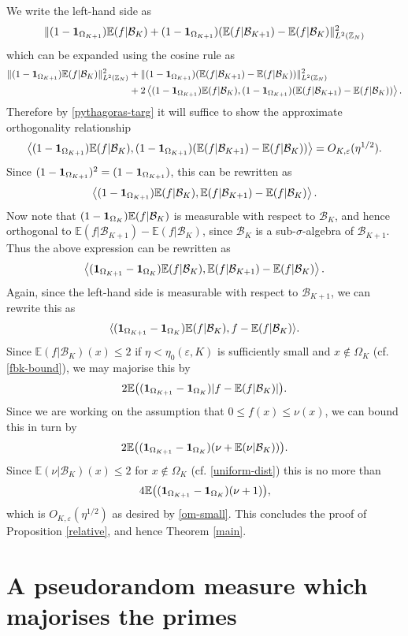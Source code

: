 \documentclass[12pt,a4paper,reqno]{amsart}
\numberwithin{equation}{section}
\theoremstyle{plain}
\theoremstyle{definition}
\renewcommand{\leq}{\leqslant}
\def\B{{\mathcal B}}
\def\Z{{\mathbb Z}}
\def\E{{\mathbb E}}
\def\eps{{\varepsilon}}
\def\ni{\noindent}
\def\endproof{\hfill{\usebox{\proofbox}}}
\begin{document}
\ni We write the left-hand side as
$$ \| (1 - {\bf 1}_{\Omega_{K+1}}) \E(f|\B_K) + (1 - {\bf 1}_{\Omega_{K+1}}) (\E(f|\B_{K+1}) - \E(f|\B_K) \|_{L^2(\Z_N)}^2$$
which can be expanded using the cosine rule as
\begin{align*}
 \| (1 - {\bf 1}_{\Omega_{K+1}}) \E(f|\B_K) \|_{L^2(\Z_N)}^2 &+ \| (1 - {\bf 1}_{\Omega_{K+1}}) (\E(f|\B_{K+1}) - \E(f|\B_K)) \|_{L^2(\Z_N)}^2 \\
&+ 2 \left\langle (1 - {\bf 1}_{\Omega_{K+1}}) \E(f|\B_K), (1 - {\bf 1}_{\Omega_{K+1}}) (\E(f|\B_{K+1}) - \E(f|\B_K)) \right\rangle.
\end{align*}
Therefore by \eqref{pythagoras-targ} it will suffice to show the approximate orthogonality relationship
$$
\left\langle (1 - {\bf 1}_{\Omega_{K+1}}) \E(f|\B_K), 
(1 - {\bf 1}_{\Omega_{K+1}}) (\E(f|\B_{K+1}) - \E(f|\B_K)) \right\rangle
= O_{K,\eps}(\eta^{1/2}).
$$
Since $(1 - {\bf 1}_{\Omega_{K+1}})^2 = (1 - {\bf 1}_{\Omega_{K+1}})$, this can be rewritten as
\[ \left\langle (1 - {\bf 1}_{\Omega_{K+1}}) \E(f|\B_K), \E(f|\B_{K+1}) - \E(f|\B_K) \right\rangle.\]
Now note that $(1 - {\bf 1}_{\Omega_K}) \E(f|\B_K)$ is measurable with respect to $\B_K$, and hence
orthogonal to $\E(f|\B_{K+1}) - \E(f|\B_K)$, since $\B_K$ is a sub-$\sigma$-algebra of $\B_{K+1}$.  Thus the
above expression can be rewritten as
$$ \left\langle ({\bf 1}_{\Omega_{K+1}} - {\bf 1}_{\Omega_K}) \E(f|\B_K), \E(f|\B_{K+1}) - \E(f|\B_K) \right\rangle.$$
Again, since the left-hand side is measurable with respect to $\B_{K+1}$, we can rewrite this as
$$ \langle ({\bf 1}_{\Omega_{K+1}} - {\bf 1}_{\Omega_K}) \E(f|\B_K), f - \E(f|\B_K) \rangle.$$
Since $\E (f | \B_K)(x) \leq 2$ if $\eta < \eta_0(\eps, K)$ is sufficiently small and $x \notin \Omega_K$ (cf. \eqref{fbk-bound}), we may majorise this by
$$ 2\E \big( ({\bf 1}_{\Omega_{K+1}} - {\bf 1}_{\Omega_K}) |f - \E(f|\B_K)| \big).$$  Since we are working on the assumption that $0 \leq f(x) \leq \nu(x)$, we can bound this in turn by
$$ 2\E\big( ({\bf 1}_{\Omega_{K+1}} - {\bf 1}_{\Omega_K}) (\nu + \E(\nu|\B_K)) \big).$$
Since $\E(\nu | \B_K)(x) \leq 2$ for $x \notin \Omega_K$ (cf. \eqref{uniform-dist}) this is no more than
$$ 4\E\big( ({\bf 1}_{\Omega_{K+1}} - {\bf 1}_{\Omega_K}) (\nu + 1) \big),$$
which is $O_{K,\eps}(\eta^{1/2})$ as desired by \eqref{om-small}.  This concludes the proof of 
Proposition \ref{relative}, and hence Theorem \ref{main}.
\endproof

\section{A pseudorandom measure which majorises the primes}\label{sec8}
\end{document}
